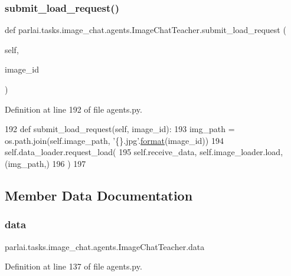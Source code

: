 \subsubsection{\texorpdfstring{submit\+\_\+load\+\_\+request()}{submit\_load\_request()}}
{\footnotesize\ttfamily def parlai.\+tasks.\+image\+\_\+chat.\+agents.\+Image\+Chat\+Teacher.\+submit\+\_\+load\+\_\+request (\begin{DoxyParamCaption}\item[{}]{self,  }\item[{}]{image\+\_\+id }\end{DoxyParamCaption})}



Definition at line 192 of file agents.\+py.


\begin{DoxyCode}
192     \textcolor{keyword}{def }submit\_load\_request(self, image\_id):
193         img\_path = os.path.join(self.image\_path, \textcolor{stringliteral}{'\{\}.jpg'}.\hyperlink{namespaceparlai_1_1chat__service_1_1services_1_1messenger_1_1shared__utils_a32e2e2022b824fbaf80c747160b52a76}{format}(image\_id))
194         self.data\_loader.request\_load(
195             self.receive\_data, self.image\_loader.load, (img\_path,)
196         )
197 
\end{DoxyCode}


\subsection{Member Data Documentation}
\mbox{\label{classparlai_1_1tasks_1_1image__chat_1_1agents_1_1ImageChatTeacher_a64d66688a29851c48e88f4c284ab57b6}} 
\subsubsection{\texorpdfstring{data}{data}}
{\footnotesize\ttfamily parlai.\+tasks.\+image\+\_\+chat.\+agents.\+Image\+Chat\+Teacher.\+data}



Definition at line 137 of file agents.\+py.

